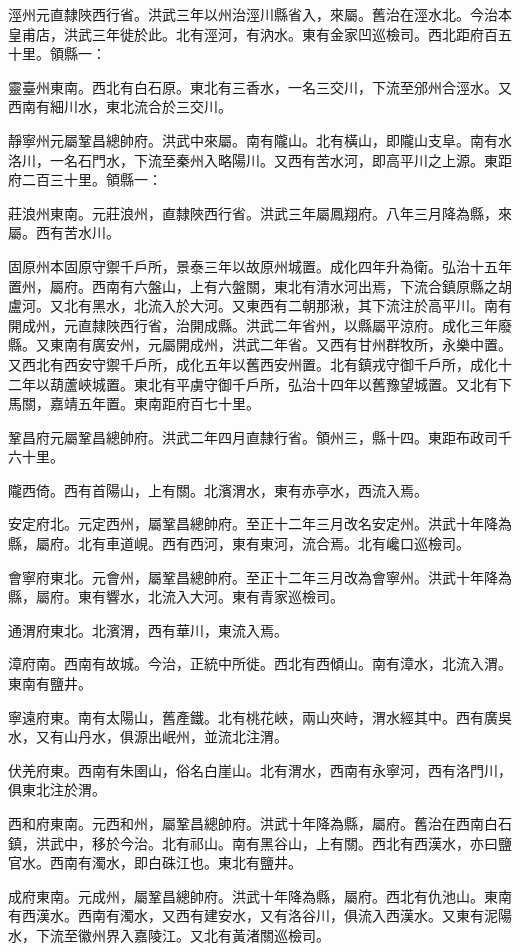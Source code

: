 涇州元直隸陜西行省。洪武三年以州治涇川縣省入，來屬。舊治在涇水北。今治本皇甫店，洪武三年徙於此。北有涇河，有汭水。東有金家凹巡檢司。西北距府百五十里。領縣一：

靈臺州東南。西北有白石原。東北有三香水，一名三交川，下流至邠州合涇水。又西南有細川水，東北流合於三交川。

靜寧州元屬鞏昌總帥府。洪武中來屬。南有隴山。北有橫山，即隴山支阜。南有水洛川，一名石門水，下流至秦州入略陽川。又西有苦水河，即高平川之上源。東距府二百三十里。領縣一：

莊浪州東南。元莊浪州，直隸陜西行省。洪武三年屬鳳翔府。八年三月降為縣，來屬。西有苦水川。

固原州本固原守禦千戶所，景泰三年以故原州城置。成化四年升為衛。弘治十五年置州，屬府。西南有六盤山，上有六盤關，東北有清水河出焉，下流合鎮原縣之胡盧河。又北有黑水，北流入於大河。又東西有二朝那湫，其下流注於高平川。南有開成州，元直隸陜西行省，治開成縣。洪武二年省州，以縣屬平涼府。成化三年廢縣。又東南有廣安州，元屬開成州，洪武二年省。又西有甘州群牧所，永樂中置。又西北有西安守禦千戶所，成化五年以舊西安州置。北有鎮戎守御千戶所，成化十二年以葫蘆峽城置。東北有平虜守御千戶所，弘治十四年以舊豫望城置。又北有下馬關，嘉靖五年置。東南距府百七十里。

鞏昌府元屬鞏昌總帥府。洪武二年四月直隸行省。領州三，縣十四。東距布政司千六十里。

隴西倚。西有首陽山，上有關。北濱渭水，東有赤亭水，西流入焉。

安定府北。元定西州，屬鞏昌總帥府。至正十二年三月改名安定州。洪武十年降為縣，屬府。北有車道峴。西有西河，東有東河，流合焉。北有巉口巡檢司。

會寧府東北。元會州，屬鞏昌總帥府。至正十二年三月改為會寧州。洪武十年降為縣，屬府。東有響水，北流入大河。東有青家巡檢司。

通渭府東北。北濱渭，西有華川，東流入焉。

漳府南。西南有故城。今治，正統中所徙。西北有西傾山。南有漳水，北流入渭。東南有鹽井。

寧遠府東。南有太陽山，舊產鐵。北有桃花峽，兩山夾峙，渭水經其中。西有廣吳水，又有山丹水，俱源出岷州，並流北注渭。

伏羌府東。西南有朱圉山，俗名白崖山。北有渭水，西南有永寧河，西有洛門川，俱東北注於渭。

西和府東南。元西和州，屬鞏昌總帥府。洪武十年降為縣，屬府。舊治在西南白石鎮，洪武中，移於今治。北有祁山。南有黑谷山，上有關。西北有西漢水，亦曰鹽官水。西南有濁水，即白硃江也。東北有鹽井。

成府東南。元成州，屬鞏昌總帥府。洪武十年降為縣，屬府。西北有仇池山。東南有西漢水。西南有濁水，又西有建安水，又有洛谷川，俱流入西漢水。又東有泥陽水，下流至徽州界入嘉陵江。又北有黃渚關巡檢司。

